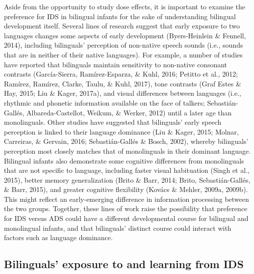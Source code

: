 \documentclass[,man,floatsintext]{apa6}
\begin{document}
Aside from the opportunity to study dose effects, it is important to examine the preference for IDS in bilingual infants for the sake of understanding bilingual development itself. Several lines of research suggest that early exposure to two languages changes some aspects of early development (Byers-Heinlein \& Fennell, 2014), including bilinguals' perception of non-native speech sounds (i.e., sounds that are in neither of their native languages). For example, a number of studies have reported that bilinguals maintain sensitivity to non-native consonant contrasts (García-Sierra, Ramírez-Esparza, \& Kuhl, 2016; Petitto et al., 2012; Ramírez, Ramírez, Clarke, Taulu, \& Kuhl, 2017), tone contrasts (Graf Estes \& Hay, 2015; Liu \& Kager, 2017a), and visual differences between languages (i.e., rhythmic and phonetic information available on the face of talkers; Sebastián-Gallés, Albareda-Castellot, Weikum, \& Werker, 2012) until a later age than monolinguals. Other studies have suggested that bilinguals' early speech perception is linked to their language dominance (Liu \& Kager, 2015; Molnar, Carreiras, \& Gervain, 2016; Sebastián-Gallés \& Bosch, 2002), whereby bilinguals' perception most closely matches that of monolinguals in their dominant language. Bilingual infants also demonstrate some cognitive differences from monolinguals that are not specific to language, including faster visual habituation (Singh et al., 2015), better memory generalization (Brito \& Barr, 2014; Brito, Sebastián-Gallés, \& Barr, 2015), and greater cognitive flexibility (Kovács \& Mehler, 2009a, 2009b). This might reflect an early-emerging difference in information processing between the two groups. Together, these lines of work raise the possibility that preference for IDS versus ADS could have a different developmental course for bilingual and monolingual infants, and that bilinguals' distinct course could interact with factors such as language dominance.

\hypertarget{bilinguals-exposure-to-and-learning-from-ids}{%
\subsection{Bilinguals' exposure to and learning from IDS}\label{bilinguals-exposure-to-and-learning-from-ids}}
\end{document}
